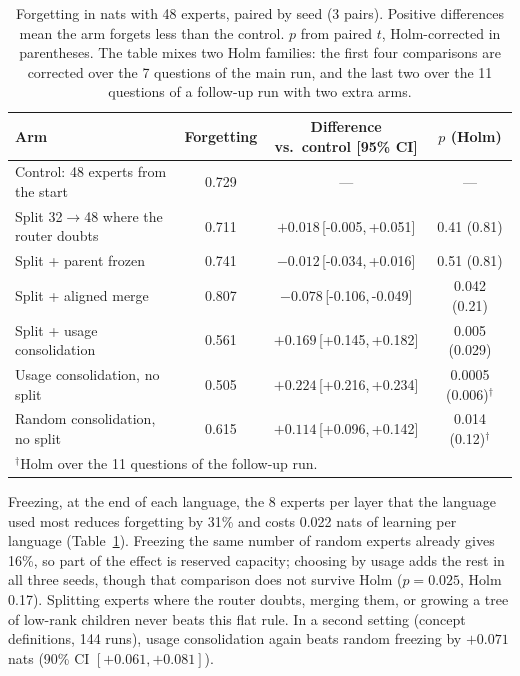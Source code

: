 \documentclass[11pt]{article}
\newcommand{\ci}[2]{\,[#1,\,#2]}
\begin{document}
\begin{table}[h]
\centering
\small
\caption{Forgetting in nats with 48 experts, paired by seed (3 pairs). Positive differences mean the arm forgets less than the control. $p$ from paired $t$, Holm-corrected in parentheses. The table mixes two Holm families: the first four comparisons are corrected over the 7 questions of the main run, and the last two over the 11 questions of a follow-up run with two extra arms.}
\label{tab:moe}
\begin{tabular}{lccc}
\toprule
Arm & Forgetting & Difference vs.\ control [95\% CI] & $p$ (Holm) \\
\midrule
Control: 48 experts from the start & 0.729 & --- & --- \\
Split 32$\rightarrow$48 where the router doubts & 0.711 & $+0.018$\ci{-0.005}{+0.051} & 0.41 (0.81) \\
Split + parent frozen & 0.741 & $-0.012$\ci{-0.034}{+0.016} & 0.51 (0.81) \\
Split + aligned merge & 0.807 & $-0.078$\ci{-0.106}{-0.049} & 0.042 (0.21) \\
Split + usage consolidation & 0.561 & $+0.169$\ci{+0.145}{+0.182} & 0.005 (0.029) \\
\midrule
Usage consolidation, no split & 0.505 & $+0.224$\ci{+0.216}{+0.234} & 0.0005 (0.006)$^{\dagger}$ \\
Random consolidation, no split & 0.615 & $+0.114$\ci{+0.096}{+0.142} & 0.014 (0.12)$^{\dagger}$ \\
\bottomrule
\multicolumn{4}{l}{\footnotesize $^{\dagger}$Holm over the 11 questions of the follow-up run.}
\end{tabular}
\end{table}

Freezing, at the end of each language, the 8 experts per layer that the language used most reduces forgetting by 31\% and costs 0.022 nats of learning per language (Table~\ref{tab:moe}).
Freezing the same number of random experts already gives 16\%, so part of the effect is reserved capacity; choosing by usage adds the rest in all three seeds, though that comparison does not survive Holm ($p=0.025$, Holm 0.17).
Splitting experts where the router doubts, merging them, or growing a tree of low-rank children never beats this flat rule.
In a second setting (concept definitions, 144 runs), usage consolidation again beats random freezing by $+0.071$ nats (90\% CI $[+0.061, +0.081]$).
\end{document}
